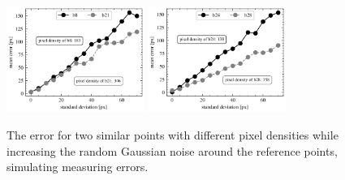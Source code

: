 \begin{figure}
    \centering
        \includegraphics[width=0.40\textwidth]{figures/pixel_density_0026.png}
        \includegraphics[width=0.40\textwidth]{figures/pixel_density_0029.png}
	\caption{The error for two similar points with different pixel densities 
		while increasing the random Gaussian noise around the reference 
		points, simulating measuring errors.}
	\label{fig:density}
\end{figure}

